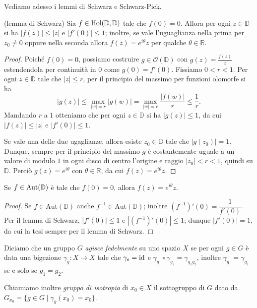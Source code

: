 Vediamo adesso i lemmi di Schwarz e Schwarz-Pick.

\begin{lm}
  (lemma di Schwarz) Sia $f \in \text{\normalfont{Hol}}(\mathbb{D},\mathbb{D})$ tale che $f(0)=0$. Allora per ogni $z \in \mathbb{D}$ si ha $|f(z)| \le |z|$ e $|f'(0)| \le 1$; inoltre, se vale l'uguaglianza nella prima per $z_0 \not=0$ oppure nella seconda allora $f(z)=e^{i\theta}z$ per qualche $\theta \in \mathbb{R}$.
\end{lm}

\begin{proof}
  Poiché $f(0)=0$, possiamo costruire $g \in \mathcal{O}(\mathbb{D})$ con $g(z)=\frac{f(z)}{z}$ estendendola per continuità in $0$ come $g(0)=f'(0)$. Fissiamo $0<r<1$.
  Per ogni $z \in \mathbb{D}$ tale che $|z| \le r$, per il principio del massimo per funzioni olomorfe si ha
  $$|g(z)| \le \max_{|w|=r} |g(w)|=\max_{|w|=r} \frac{|f(w)|}{r} \le \frac{1}{r}.$$
  Mandando $r$ a $1$ otteniamo che per ogni $z \in \mathbb{D}$ si ha $|g(z)| \le 1$, da cui $|f(z)|\le |z|$ e $|f'(0)| \le 1$.

  Se vale una delle due ugaglianze, allora esiste $z_0 \in \mathbb{D}$ tale che $|g(z_0)|=1$. Dunque, sempre per il principio del massimo $g$ è costantemente uguale a un valore di modulo $1$ in ogni disco di centro l'origine e raggio $|z_0|<r<1$, quindi su $\mathbb{D}$. Perciò $g(z)=e^{i\theta}$ con $\theta \in \mathbb{R}$, da cui $f(z)=e^{i\theta}z$.
\end{proof}

\begin{cor} \label{cor_schw}
  Se $f \in \text{\normalfont{Aut}}(\mathbb{D})$ è tale che $f(0)=0$, allora $f(z)=e^{i\theta}z$.
\end{cor}

\begin{proof}
  Se $f \in \text{Aut}(\mathbb{D})$ anche $f^{-1} \in \text{Aut}(\mathbb{D})$; inoltre $(f^{-1})'(0)=\dfrac{1}{f'(0)}$. Per il lemma di Schwarz, $|f'(0)| \le 1$ e $|(f^{-1})'(0)| \le 1$; dunque $|f'(0)|=1$, da cui la tesi sempre per il lemma di Schwarz.
\end{proof}

\begin{defn}
  Diciamo che un gruppo $G$ \textit{agisce fedelmente} su uno spazio $X$ se per ogni $g \in G$ è data una bigezione $\gamma_g:X \longrightarrow X$ tale che $\gamma_{e}=\operatorname{id}$ e $\gamma_{g_1} \circ \gamma_{g_2} =\gamma_{g_1g_2}$, inoltre $\gamma_{g_1}=\gamma_{g_2}$ se e solo se $g_1=g_2$.

  Chiamiamo inoltre \textit{gruppo di isotropia} di $x_0 \in X$ il sottogruppo di $G$ dato da $G_{x_0}=\{g \in G \mid \gamma_g(x_0)=x_0\}$.
\end{defn}


